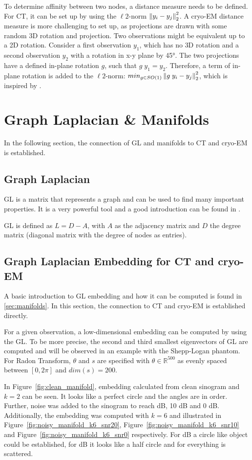 To determine affinity between two nodes, a distance measure needs to be defined.
For CT, it can be set up by using the $\ell2$-norm $\left\lVert y_i - y_j\right\rVert^2_2$.
A cryo-EM distance measure is more challenging to set up, as projections are drawn with some random 3D rotation and projection.
Two observations might be equivalent up to a 2D rotation. 
Consider a first observation $y_1$, which has no 3D rotation and 
a second observation $y_2$ with a rotation in x-y plane by 45°.
The two projections have a defined in-plane rotation $g$, such that $g \; y_1 = y_2$.
Therefore, a term of in-plane rotation is added to the $\ell2$-norm: $min_{g \in SO(1)}\left\lVert g \;y_i - y_j\right\rVert^2_2$, 
which is inspired by \cite{multiDiffusionMaps}.


\section{Graph Laplacian \& Manifolds}
In the following section, the connection of GL and manifolds to CT and cryo-EM is established.

\subsection{Graph Laplacian}
GL is a matrix that represents a graph and can be used to find many important properties.
It is a very powerful tool and a good introduction can be found in \cite{tutorialSpectralClustering, SpectralGraphTheory}. 

GL is defined as $L = D - A$, with $A$ as the adjacency matrix and $D$ the degree matrix (diagonal matrix with the degree of nodes as entries).

\subsection{Graph Laplacian Embedding for CT and cryo-EM}
A basic introduction to GL embedding and how it can be computed is found in \ref{sec:manifolds}.
In this section, the connection to CT and cryo-EM is established directly.

For a given observation, a low-dimensional embedding can be computed by using the GL.
To be more precise, the second and third smallest eigenvectors of GL are computed and will be observed in an example 
with the Shepp-Logan phantom.
For Radon Transform, $\theta$ and $s$ are specified with $\theta \in \mathbb{R}^{500}$ as evenly spaced
between $[0, 2 \pi]$ and $dim(s) = 200$. 

In Figure~\ref{fig:clean_manifold}, embedding calculated from clean sinogram and $k=2$ can be seen.
It looks like a perfect circle and the angles are in order. 
Further, noise was added to the sinogram to reach  dB, 10 dB and 0 dB. 
Additionally, the embedding was computed with $k=6$ and illustrated in Figure~\ref{fig:noisy_manifold_k6_snr20},
Figure~\ref{fig:noisy_manifold_k6_snr10} and Figure~\ref{fig:noisy_manifold_k6_snr0} respectively.
For  dB a circle like object could be established, for  dB it looks like a half circle and for \snry
everything is scattered. 

